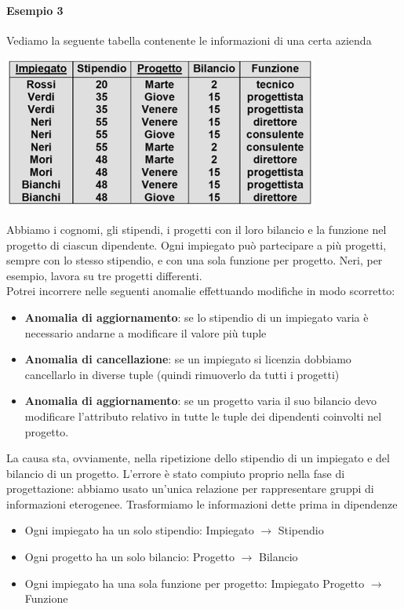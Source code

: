 \paragraph{Esempio 3} Vediamo la seguente tabella contenente le informazioni di una certa azienda
\begin{center}
	\includegraphics{images/129.PNG}
\end{center}
Abbiamo i cognomi, gli stipendi, i progetti con il loro bilancio e la funzione nel progetto di ciascun dipendente. Ogni impiegato può partecipare a più progetti, sempre con lo stesso stipendio, e con una sola funzione per progetto. Neri, per esempio, lavora su tre progetti differenti.\\
Potrei incorrere nelle seguenti anomalie effettuando modifiche in modo scorretto:
\begin{itemize}
	\item \textbf{Anomalia di aggiornamento}: se lo stipendio di un impiegato varia è necessario andarne a modificare il valore più tuple
	\item \textbf{Anomalia di cancellazione}: se un impiegato si licenzia dobbiamo cancellarlo in diverse tuple (quindi rimuoverlo da tutti i progetti)
	\item \textbf{Anomalia di aggiornamento}: se un progetto varia il suo bilancio devo modificare l'attributo relativo in tutte le tuple dei dipendenti coinvolti nel progetto.
\end{itemize}
La causa sta, ovviamente, nella ripetizione dello stipendio di un impiegato e del bilancio di un progetto. L'errore è stato compiuto proprio nella fase di progettazione: abbiamo usato un'unica relazione per rappresentare gruppi di informazioni eterogenee. Trasformiamo le informazioni dette prima in dipendenze
\begin{itemize}
	\item Ogni impiegato ha un solo stipendio: Impiegato $\longrightarrow$ Stipendio
	\item Ogni progetto ha un solo bilancio: Progetto $\longrightarrow$ Bilancio
	\item Ogni impiegato ha una sola funzione per progetto: Impiegato Progetto $\longrightarrow$ Funzione
\end{itemize}
